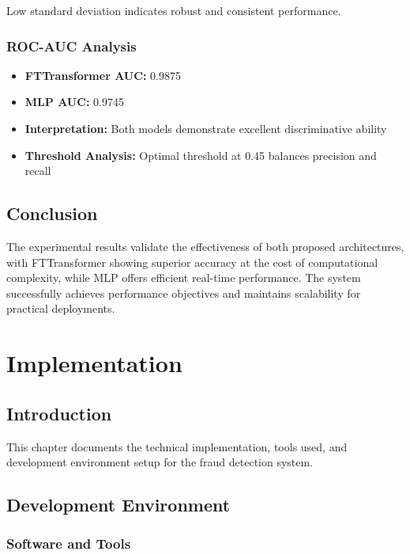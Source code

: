 \documentclass[12pt,a4paper,twoside]{report}
\begin{document}
Low standard deviation indicates robust and consistent performance.

\subsection{ROC-AUC Analysis}

\begin{itemize}
    \item \textbf{FTTransformer AUC:} 0.9875
    \item \textbf{MLP AUC:} 0.9745
    \item \textbf{Interpretation:} Both models demonstrate excellent discriminative ability
    \item \textbf{Threshold Analysis:} Optimal threshold at 0.45 balances precision and recall
\end{itemize}

\section{Conclusion}

The experimental results validate the effectiveness of both proposed architectures, with FTTransformer showing superior accuracy at the cost of computational complexity, while MLP offers efficient real-time performance. The system successfully achieves performance objectives and maintains scalability for practical deployments.

\chapter{Implementation}

\section{Introduction}

This chapter documents the technical implementation, tools used, and development environment setup for the fraud detection system.

\section{Development Environment}

\subsection{Software and Tools}
\end{document}
